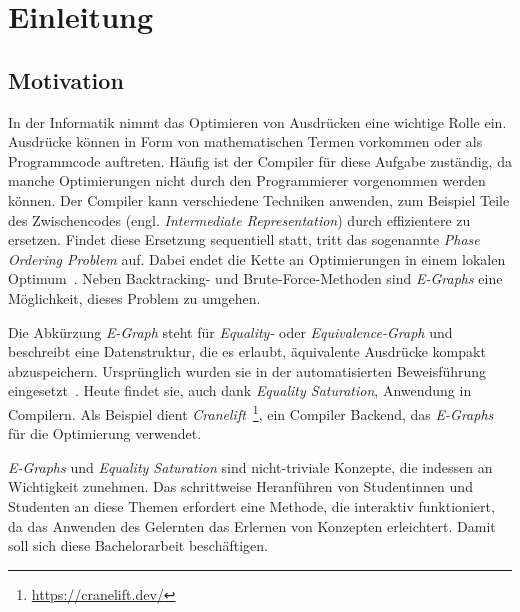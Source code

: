 \section{Einleitung}\label{sec:einleitung}

\subsection{Motivation}






\noindent In der Informatik nimmt das Optimieren von Ausdrücken eine wichtige Rolle ein. 
Ausdrücke können in Form von mathematischen Termen vorkommen oder als Programmcode auftreten.
Häufig ist der Compiler für diese Aufgabe zuständig, da manche Optimierungen nicht durch den Programmierer vorgenommen werden können. 
Der Compiler kann verschiedene Techniken anwenden, zum Beispiel Teile des Zwischencodes (engl. \textit{Intermediate Representation}) durch effizientere zu ersetzen.
Findet diese Ersetzung sequentiell statt, tritt das sogenannte \textit{Phase Ordering Problem} auf. Dabei endet die Kette an Optimierungen in einem lokalen Optimum~\cite{phaseorder-2009}.
Neben Backtracking- und Brute-Force-Methoden sind \textit{E-Graphs} eine Möglichkeit, dieses Problem zu umgehen. 

\noindent Die Abkürzung \textit{E-Graph} steht für \textit{Equality-} oder \textit{Equivalence-Graph} und beschreibt eine Datenstruktur, die es
erlaubt, äquivalente Ausdrücke kompakt abzuspeichern.
Ursprünglich wurden sie in der automatisierten Beweisführung eingesetzt~\cite{2021-egg}. Heute findet sie, auch dank \textit{Equality Saturation}, Anwendung in Compilern.
Als Beispiel dient \textit{Cranelift}~\footnote{\hspace{1.5mm}\url{https://cranelift.dev/}}, ein Compiler Backend, das \textit{E-Graphs} für die Optimierung verwendet.

\noindent \textit{E-Graphs} und \textit{Equality Saturation} sind nicht-triviale Konzepte, die indessen an Wichtigkeit zunehmen. 
Das schrittweise Heranführen von Studentinnen und Studenten an diese Themen erfordert eine Methode, die interaktiv funktioniert, da das Anwenden des Gelernten 
das Erlernen von Konzepten erleichtert. Damit soll sich diese Bachelorarbeit beschäftigen. 


